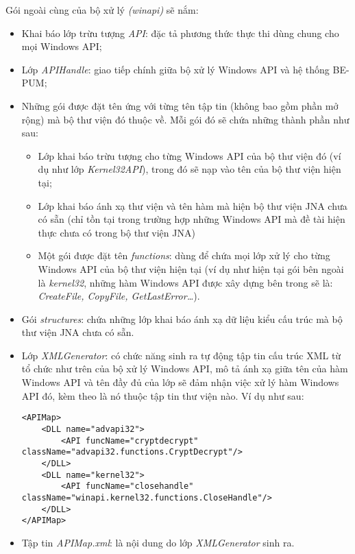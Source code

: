 Gói ngoài cùng của bộ xử lý \textit{(winapi)} sẽ nắm:
\begin{itemize}
	\item Khai báo lớp trừu tượng \textit{API}: đặc tả phương thức thực thi dùng chung cho mọi Windows API;
	\item Lớp \textit{APIHandle}: giao tiếp chính giữa bộ xử lý Windows API và hệ thống BE-PUM;
	\item Những gói được đặt tên ứng với từng tên tập tin (không bao gồm phần mở rộng) mà bộ thư viện đó thuộc về. Mỗi gói đó sẽ chứa những thành phần như sau:
	
	\begin{itemize}
		\item Lớp khai báo trừu tượng cho từng Windows API của bộ thư viện đó (ví dụ như lớp \textit{Kernel32API}), trong đó sẽ nạp vào tên của bộ thư viện hiện tại;
		\item Lớp khai báo ánh xạ thư viện và tên hàm mà hiện bộ thư viện JNA chưa có sẵn (chỉ tồn tại trong trường hợp những Windows API mà đề tài hiện thực chưa có trong bộ thư viện JNA)
		\item Một gói được đặt tên \textit{functions}: dùng để chứa mọi lớp xử lý cho từng Windows API của bộ thư viện hiện tại (ví dụ như hiện tại gói bên ngoài là \textit{kernel32}, những hàm Windows API được xây dựng bên trong sẽ là: \textit{CreateFile, CopyFile, GetLastError…}).
	\end{itemize}
	\item Gói \textit{structures}: chứa những lớp khai báo ánh xạ dữ liệu kiểu cấu trúc mà bộ thư viện JNA chưa có sẵn.
	\item Lớp \textit{XMLGenerator}: có chức năng sinh ra tự động tập tin cấu trúc XML từ tổ chức như trên của bộ xử lý Windows API, mô tả ánh xạ giữa tên của hàm Windows API và tên đầy đủ của lớp sẽ đảm nhận việc xử lý hàm Windows API đó, kèm theo là nó thuộc tập tin thư viện nào. Ví dụ như sau:
\begin{boxedminipage}{12cm}
\begin{small}
\lstset{language=HTML}
\begin{lstlisting}
<APIMap>
	<DLL name="advapi32">
		<API funcName="cryptdecrypt" 
className="advapi32.functions.CryptDecrypt"/>
	</DLL>
	<DLL name="kernel32">
		<API funcName="closehandle" 
className="winapi.kernel32.functions.CloseHandle"/>
	</DLL>
</APIMap>
\end{lstlisting}
\end{small}
\end{boxedminipage}
	\item Tập tin \textit{APIMap.xml}: là nội dung do lớp \textit{XMLGenerator} sinh ra.
\end{itemize}

